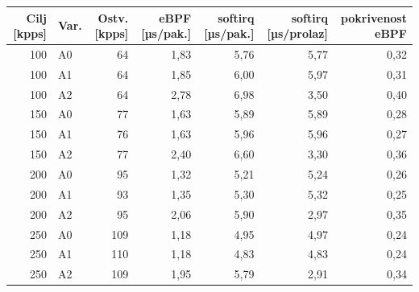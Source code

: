 \begin{tabular}{@{}rlrrrrr@{}}
\toprule
Cilj [kpps] & Var. & Ostv. [kpps] & eBPF [µs/pak.] & softirq [µs/pak.] & softirq [µs/prolaz] & pokrivenost eBPF \\
\midrule
100 & A0 & 64 & 1{,}83 & 5{,}76 & 5{,}77 & 0{,}32 \\
100 & A1 & 64 & 1{,}85 & 6{,}00 & 5{,}97 & 0{,}31 \\
100 & A2 & 64 & 2{,}78 & 6{,}98 & 3{,}50 & 0{,}40 \\
\midrule
150 & A0 & 77 & 1{,}63 & 5{,}89 & 5{,}89 & 0{,}28 \\
150 & A1 & 76 & 1{,}63 & 5{,}96 & 5{,}96 & 0{,}27 \\
150 & A2 & 77 & 2{,}40 & 6{,}60 & 3{,}30 & 0{,}36 \\
\midrule
200 & A0 & 95 & 1{,}32 & 5{,}21 & 5{,}24 & 0{,}26 \\
200 & A1 & 93 & 1{,}35 & 5{,}30 & 5{,}32 & 0{,}25 \\
200 & A2 & 95 & 2{,}06 & 5{,}90 & 2{,}97 & 0{,}35 \\
\midrule
250 & A0 & 109 & 1{,}18 & 4{,}95 & 4{,}97 & 0{,}24 \\
250 & A1 & 110 & 1{,}18 & 4{,}83 & 4{,}83 & 0{,}24 \\
250 & A2 & 109 & 1{,}95 & 5{,}79 & 2{,}91 & 0{,}34 \\
\bottomrule
\end{tabular}
